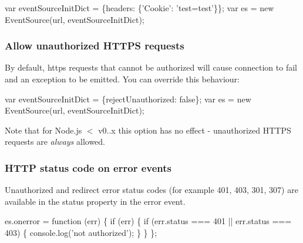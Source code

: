\begin{DoxyCode}
var eventSourceInitDict = \{headers: \{'Cookie': 'test=test'\}\};
var es = new EventSource(url, eventSourceInitDict);
\end{DoxyCode}


\subsubsection*{Allow unauthorized H\+T\+T\+PS requests}

By default, https requests that cannot be authorized will cause connection to fail and an exception to be emitted. You can override this behaviour\+:


\begin{DoxyCode}
var eventSourceInitDict = \{rejectUnauthorized: false\};
var es = new EventSource(url, eventSourceInitDict);
\end{DoxyCode}


Note that for Node.\+js $<$ v0..\+x this option has no effect -\/ unauthorized H\+T\+T\+PS requests are {\itshape always} allowed.

\subsubsection*{H\+T\+TP status code on error events}

Unauthorized and redirect error status codes (for example 401, 403, 301, 307) are available in the {\ttfamily status} property in the error event.


\begin{DoxyCode}
es.onerror = function (err) \{
  if (err) \{
    if (err.status === 401 || err.status === 403) \{
      console.log('not authorized');
    \}
  \}
\};
\end{DoxyCode}
 